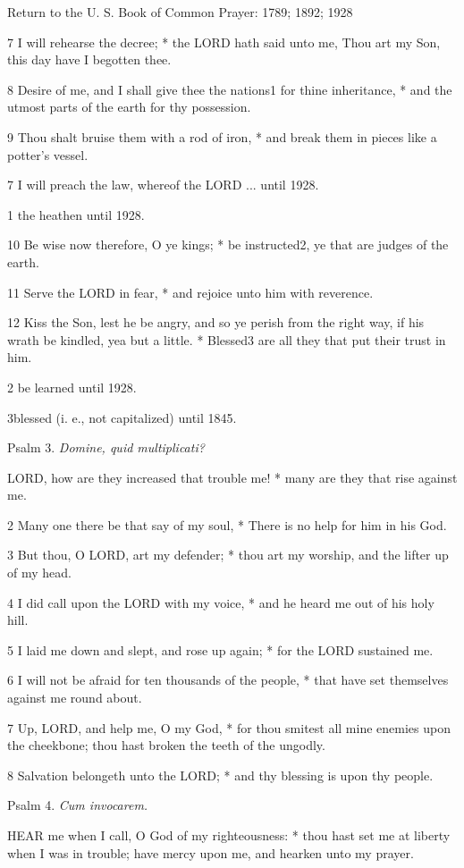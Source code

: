 Return to the U. S. Book of Common Prayer: 1789;
1892; 1928

7 I will rehearse the decree; * the LORD hath said
unto me, Thou art my Son, this day have I begotten thee.

8 Desire of me, and I shall give thee the nations1
for thine inheritance, * and the utmost parts of the earth for thy possession.

9 Thou shalt bruise them with a rod of iron, * and break
them in pieces like a potter's vessel.

7 I will preach the law,
whereof the LORD ... until
1928.

1 the heathen until
1928.

10 Be wise now therefore, O ye kings; * be instructed2, ye
that are judges of the earth.

11 Serve the LORD in fear, *
and rejoice unto him with reverence.

12 Kiss the Son, lest he be angry, and so ye perish
from the right way, if his wrath be kindled, yea but a little. * Blessed3
are all they that put their trust in him.

2 be
learned until
1928.

3blessed (i.
e., not capitalized) until 1845.

Psalm
3. \emph{Domine, quid multiplicati?}

LORD,
how are they increased that trouble me! * many are they that rise against
me.

2 Many one there be that say of my soul, * There is
no help for him in his God.

3 But thou, O LORD, art my defender;
* thou art my worship, and the lifter up of my head.

4 I did call upon the LORD with
my voice, * and he heard me out of his holy hill.

5 I laid me down and slept, and rose up again; * for
the LORD sustained me.

6 I will not be afraid for ten thousands of the people,
* that have set themselves against me round about.

7 Up, LORD, and help me, O my
God, * for thou smitest all mine enemies upon the cheekbone; thou hast
broken the teeth of the ungodly.

8 Salvation belongeth unto the LORD;
* and thy blessing is upon thy people. 

Psalm
4. \emph{Cum invocarem.}

HEAR
me when I call, O God of my righteousness: * thou hast set me at liberty
when I was in trouble; have mercy upon me, and hearken unto my prayer.

